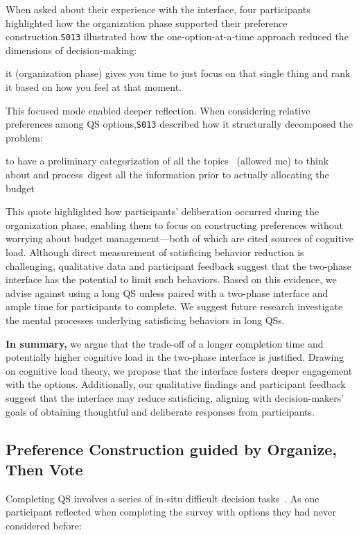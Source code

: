 When asked about their experience with the interface, four participants highlighted how the organization phase supported their preference construction.\texttt{S013} illustrated how the one-option-at-a-time approach reduced the dimensions of decision-making:

\begin{displayquote}  
\bracketellipsis it (organization phase) gives you time to just focus on that single thing and rank it based on how you feel at that moment. \hfill{}  
\end{displayquote}  

This focused mode enabled deeper reflection. When considering relative preferences among QS options,\texttt{S013} described how it structurally decomposed the problem:

\begin{displayquote}  
\bracketellipsis to have a preliminary categorization of all the topics ~\bracketellipsis (allowed me) to think about and process~\bracketellipsis digest all the information prior to actually allocating the budget~\bracketellipsis \hfill{}  
\end{displayquote}  

This quote highlighted how participants' deliberation occurred during the organization phase, enabling them to focus on constructing preferences without worrying about budget management—both of which are cited sources of cognitive load. Although direct measurement of satisficing behavior reduction is challenging, qualitative data and participant feedback suggest that the two-phase interface has the potential to limit such behaviors. Based on this evidence, we advise against using a long QS unless paired with a two-phase interface and ample time for participants to complete. We suggest future research investigate the mental processes underlying satisficing behaviors in long QSs. 

\textbf{In summary,} we argue that the trade-off of a longer completion time and potentially higher cognitive load in the two-phase interface is justified. Drawing on cognitive load theory, we propose that the interface fosters deeper engagement with the options. Additionally, our qualitative findings and participant feedback suggest that the interface may reduce satisficing, aligning with decision-makers' goals of obtaining thoughtful and deliberate responses from participants.

\subsection{Preference Construction guided by Organize, Then Vote}
Completing QS involves a series of in-situ difficult decision tasks~\textcite{lichtensteinConstructionPreference2006}. As one participant reflected when completing the survey with options they had never considered before:

